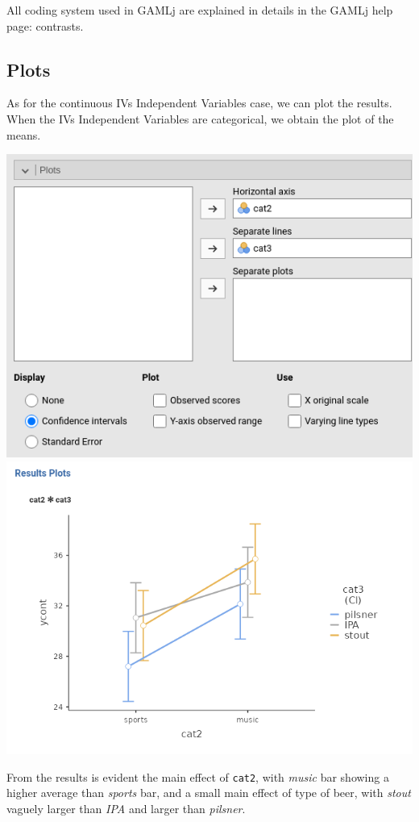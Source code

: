 \documentclass[
]{book}
\begin{document}
All coding system used in {GAMLj} are explained in details in the GAMLj help page: contrasts.

\hypertarget{plots}{%
\subsection{Plots}\label{plots}}

As for the continuous {IVs {Independent Variables} } case, we can plot the results. When the {IVs {Independent Variables} } are categorical, we obtain the plot of the means.

\includegraphics{bookletpics/2_anova_input5.png}
\includegraphics{bookletpics/2_anova_output5.png}

From the results is evident the main effect of \texttt{cat2}, with \emph{music} bar showing a higher average than \emph{sports} bar, and a small main effect of type of beer, with \emph{stout} vaguely larger than \emph{IPA} and larger than \emph{pilsner}.
\end{document}
